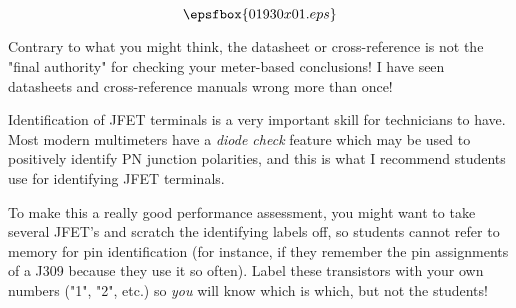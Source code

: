 

$$\epsfbox{01930x01.eps}$$

\vfil \eject






Contrary to what you might think, the datasheet or cross-reference is not the "final authority" for checking your meter-based conclusions!  I have seen datasheets and cross-reference manuals wrong more than once!







Identification of JFET terminals is a very important skill for technicians to have.  Most modern multimeters have a {\it diode check} feature which may be used to positively identify PN junction polarities, and this is what I recommend students use for identifying JFET terminals.

To make this a really good performance assessment, you might want to take several JFET's and scratch the identifying labels off, so students cannot refer to memory for pin identification (for instance, if they remember the pin assignments of a J309 because they use it so often).  Label these transistors with your own numbers ("1", "2", etc.) so {\it you} will know which is which, but not the students!




